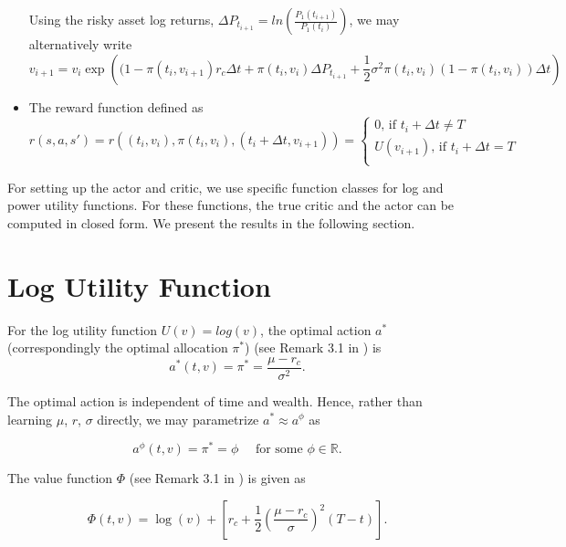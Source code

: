 \begin{itemize}
    Using the risky asset log returns, $\Delta P_{t_{i+1}}=ln\left(\frac{P_1(t_{i+1})}{P_1(t_{i})}\right)$, we may alternatively write$$v_{i+1} = v_{i} \exp \left ( (1-\pi(t_i,v_{i+1})r_c \Delta t+ \pi(t_i,v_i)\Delta P_{t_{i+1}}+\frac{1}{2}\sigma^2\pi(t_i,v_i)(1-\pi(t_i,v_i))\Delta t  \right)$$
    \item The reward function defined as 
    \begin{equation}
        r(s,a,s')     = r\left((t_i,v_i),\pi(t_i,v_i),(t_i+\Delta t,v_{i+1})\right)=   
                    \begin{cases}
                    0  \textrm{, if }t_i +\Delta t \neq T  \\
                    U(v_{i+1}) \textrm{, if }t_i +\Delta t = T \\
\end{cases}
    \end{equation}
    
\end{itemize}
 For setting up the actor and critic, we use specific function classes for log and power utility functions. For these functions, the true critic and the actor can be computed in closed form. We present the results in the following section.

 \section{Log Utility Function}
For the log utility function $U(v) = log(v)$, the optimal action $a^*$ (correspondingly the optimal allocation $\pi^*$) (see Remark 3.1 in \cite{FernandezKschonnek2022}) is \\

\begin{equation}\label{optimallog}
a^*(t,v) = \pi^* = \frac{\mu-r_c}{\sigma^2}.
\end{equation}

The optimal action is independent of time and wealth. Hence, rather than learning $\mu$, $r$, $\sigma$ directly, we may parametrize $a^* \approx a^{\phi}$ as

\begin{equation}\label{optimalaplog}
a^\phi(t,v) = \pi^* = \phi \quad \text{ for some } \phi \in \mathbb{R}.
\end{equation}

The value function $\Phi$ (see Remark 3.1 in \cite{FernandezKschonnek2022}) is given as

\begin{equation}\label{logUEquation}
\Phi(t,v)  = \log(v) + \left[r_c + \frac{1}{2}\left(\frac{\mu-r_c}{\sigma}\right)^2(T-t) \right]    .
\end{equation}

